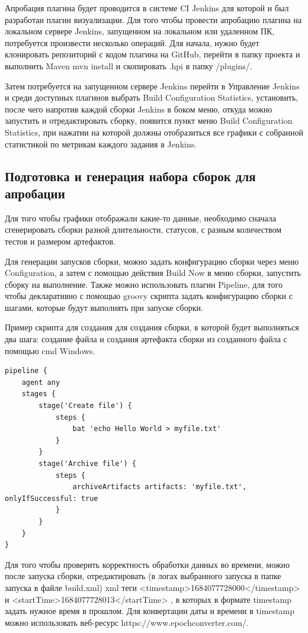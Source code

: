 Апробация плагина будет проводится в системе CI Jenkins для которой и был разработан плагин визуализации. Для того чтобы провести апробацию плагина на локальном сервере Jenkins, запущенном на локальном или удаленном ПК, потребуется произвести несколько операций. Для начала, нужно будет клонировать репозиторий с кодом плагина на GitHub, перейти в папку проекта и выполнить \cite{deployplugin} Maven mvn install и скопировать .hpi в папку /plugins/. 
 
 Затем потребуется на запущенном сервере Jenkins перейти в Управление Jenkins  и среди доступных плагинов выбрать Build Configuration Statistics, установить, после чего напротив каждой сборки Jenkins в боком меню, откуда можно запустить и отредактировать сборку, появится пункт меню Build Configuration Statistics, при нажатии на которой должны отобразиться все графики с собранной статистикой по метрикам каждого задания в Jenkins. 
 
 \subsection{Подготовка и генерация набора сборок для апробации}
 
 Для того чтобы графики отображали какие-то данные, необходимо сначала сгенерировать сборки разной длительности, статусов, с разным количеством тестов и размером артефактов.
 
Для генерации запусков сборки, можно задать конфигурацию сборки через меню Configuration, а затем с помощью действия Build Now в меню сборки, запустить сборку на выполнение. Также можно использовать плагин Pipeline, для того чтобы декларативно с помощью groovy скрипта задать конфигурацию сборки с шагами, которые будут выполнять при запуске сборки. 

Пример скрипта для создания для создания сборки, в которой будет выполняться два шага: создание файла и создания артефакта сборки из созданного файла с помощью cmd Windows.

\begin{lstlisting}
pipeline {
    agent any
    stages {
        stage('Create file') {
            steps {
                bat 'echo Hello World > myfile.txt'
            }
        }
        stage('Archive file') {
            steps {
                archiveArtifacts artifacts: 'myfile.txt', onlyIfSuccessful: true
            }
        }
    }
}
\end{lstlisting}

Для того чтобы проверить корректность обработки данных во времени, можно после запуска сборки, отредактировать (в логах выбранного запуска в папке запуска в файле build.xml) xml теги   <timestamp>1684077728000</timestamp> и
  <startTime>1684077728013</startTime> , в которых в формате timestamp задать нужное время в прошлом. Для конвертации даты и времени в timestamp можно использовать веб-ресурс https://www.epochconverter.com/.
  
